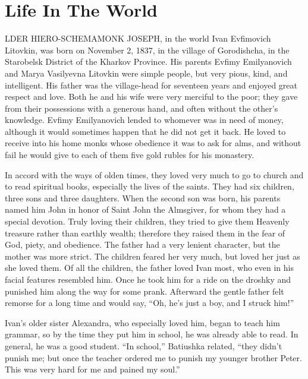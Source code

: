\chapter{Life In The World}
LDER HIERO-SCHEMAMONK JOSEPH, in the world Ivan Evfimovich Litovkin, was born on November 2, 1837, in the village of Gorodishcha, in the Starobelsk District of the Kharkov Province. His parents Evfimy Emilyanovich and Marya Vasilyevna Litovkin were simple people, but very pious, kind, and intelligent. His father was the village-head for seventeen years and enjoyed great respect and love. Both he and his wife were very merciful to the poor; they gave from their possessions with a generous hand, and often without the other's knowledge. Evfimy Emilyanovich lended to whomever was in need of money, although it would sometimes happen that he did not get it back. He loved to receive into his home monks whose obedience it was to ask for alms, and without fail he would give to each of them five gold rubles for his monastery.

In accord with the ways of olden times, they loved very much to go to church and to read spiritual books, especially the lives of the saints. They had six children, three sons and three daughters. When the second son was born, his parents named him John in honor of Saint John the Almsgiver, for whom they had a special devotion. Truly loving their children, they tried to give them Heavenly treasure rather than earthly wealth; therefore they raised them in the fear of God, piety, and obedience. The father had a very lenient character, but the mother was more strict. The children feared her very much, but loved her just as she loved them. Of all the children, the father loved Ivan most, who even in his facial features resembled him. Once he took him for a ride on the droshky and punished him along the way for some prank. Afterward the gentle father felt remorse for a long time and would say, “Oh, he's just a boy, and I struck him!”

Ivan's older sister Alexandra, who especially loved him, began to teach him grammar, so by the time they put him in school, he was already able to read. In general, he was a good student. “In school,” Batiushka related, “they didn't punish me; but once the teacher ordered me to punish my younger brother Peter. This was very hard for me and pained my soul.”

